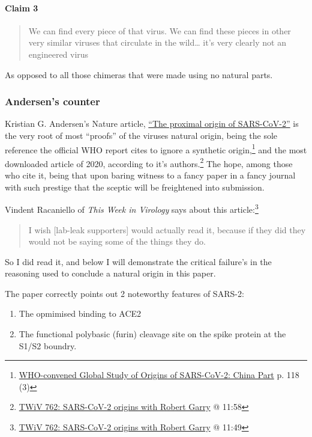 \documentclass[11pt]{article}
\begin{document}
\paragraph{Claim 3}
\label{sec:org2d14f5b}
\begin{quote}
We can find every piece of that virus. We can find these pieces in other very similar viruses that circulate in the wild\ldots{} it's very clearly not an engineered virus
\end{quote}
As opposed to all those chimeras that were made using no natural parts.
\subsubsection{Andersen's counter}
\label{sec:org92badc6}
Kristian G. Andersen's Nature article, \href{https://www.nature.com/articles/s41591-020-0820-9}{``The proximal origin of SARS-CoV-2''} is the very root of most ``proofs'' of the viruses natural origin, being the sole reference the official WHO report cites to ignore a synthetic origin,\footnote{\href{https://www.who.int/publications/i/item/who-convened-global-study-of-origins-of-sars-cov-2-china-part}{WHO-convened Global Study of Origins of SARS-CoV-2: China Part} p. 118 (3)} and the most downloaded article of 2020, according to it's authors.\footnote{\href{https://youtu.be/IxwrDSYrhjU?t=718}{TWiV 762: SARS-CoV-2 origins with Robert Garry} @ 11:58} The hope, among those who cite it, being that upon baring witness to a fancy paper in a fancy journal with such prestige that the sceptic will be freightened into submission.

Vindent Racaniello of \emph{This Week in Virology} says about this article:\footnote{\href{https://youtu.be/IxwrDSYrhjU?t=709}{TWiV 762: SARS-CoV-2 origins with Robert Garry} @ 11:49}
\begin{quote}
I wish [lab-leak supporters] would actually read it, because if they did they would not be saying some of the things they do.
\end{quote}
So I did read it, and below I will demonstrate the critical failure's in the reasoning used to conclude a natural origin in this paper.

The paper correctly points out 2 noteworthy features of SARS-2:
\begin{enumerate}
\item The opmimised binding to ACE2
\item The functional polybasic (furin) cleavage site on the spike protein at the S1/S2 boundry.
\end{enumerate}
\end{document}
